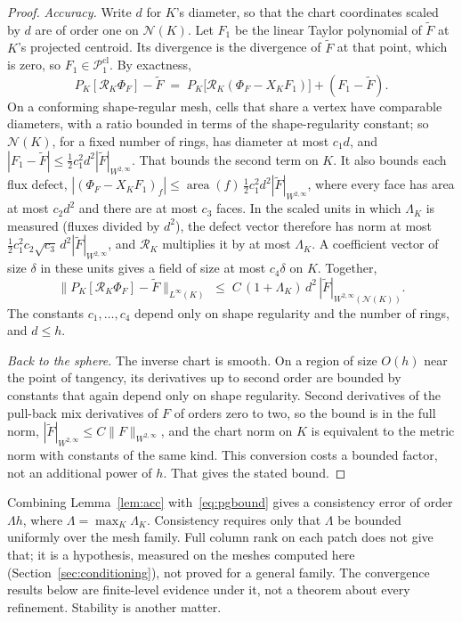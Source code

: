 \documentclass[11pt]{article}
\theoremstyle{definition}
\theoremstyle{remark}
\newcommand{\cR}{\mathcal{R}}
\newcommand{\norm}[1]{\lVert #1\rVert}
\newcommand{\Pone}{\mathcal{P}_1^{\mathrm{cl}}}
\begin{document}
\begin{proof}
\emph{Accuracy.} Write $d$ for $K$'s diameter, so that the chart coordinates scaled by $d$ are
of order one on $\mathcal N(K)$. Let $F_1$ be the linear Taylor polynomial of $\tilde F$ at $K$'s
projected centroid. Its divergence is the divergence of $\tilde F$ at that point, which is
zero, so $F_1\in\Pone$. By exactness,
\[
  P_K[\cR_K\Phi_F]-\tilde F \;=\; P_K\bigl[\cR_K(\Phi_F-X_KF_1)\bigr]+(F_1-\tilde F).
\]
On a conforming shape-regular mesh, cells that share a vertex have comparable diameters, with a
ratio bounded in terms of the shape-regularity constant; so $\mathcal N(K)$, for a fixed number of
rings, has diameter at most $c_1d$, and
$|F_1-\tilde F|\le\tfrac12 c_1^2d^2|\tilde F|_{W^{2,\infty}}$. That bounds the second term on $K$.
It also bounds each flux defect, $|(\Phi_F-X_KF_1)_f|\le\operatorname{area}(f)\,\tfrac12c_1^2d^2|\tilde
F|_{W^{2,\infty}}$, where every face has area at most $c_2d^2$ and there are at most $c_3$ faces. In
the scaled units in which $\Lambda_K$ is measured (fluxes divided by $d^2$), the defect vector
therefore has norm at most $\tfrac12c_1^2c_2\sqrt{c_3}\,d^2|\tilde F|_{W^{2,\infty}}$, and $\cR_K$
multiplies it by at most $\Lambda_K$. A coefficient vector of size $\delta$ in these units gives a
field of size at most $c_4\delta$ on $K$. Together,
\[
  \norm{P_K[\cR_K\Phi_F]-\tilde F}_{L^\infty(K)}\;\le\;C\,(1+\Lambda_K)\,d^2\,|\tilde F|_{W^{2,\infty}(\mathcal N(K))}.
\]
The constants $c_1,\dots,c_4$ depend only on shape regularity and the number of rings, and
$d\le h$.

\emph{Back to the sphere.} The inverse chart is smooth. On a region of size $O(h)$ near the point
of tangency, its derivatives up to second order are bounded by constants that again depend only
on shape regularity. Second derivatives of the pull-back mix derivatives of $F$ of orders zero to
two, so the bound is in the full norm, $|\tilde F|_{W^{2,\infty}}\le C\norm{F}_{W^{2,\infty}}$, and
the chart norm on $K$ is equivalent to the metric norm with constants of the same kind. This conversion costs a bounded
factor, not an additional power of $h$. That gives the stated bound.
\end{proof}

Combining Lemma~\ref{lem:acc} with~\eqref{eq:pgbound} gives a consistency error of order
$\Lambda h$, where $\Lambda=\max_K\Lambda_K$. Consistency requires only that $\Lambda$ be
bounded uniformly over the mesh family. Full column rank on each patch does not give that; it is a
hypothesis, measured on the meshes computed here (Section~\ref{sec:conditioning}), not proved for a
general family. The convergence results below are finite-level evidence under it, not a theorem
about every refinement. Stability is another matter.
\end{document}
